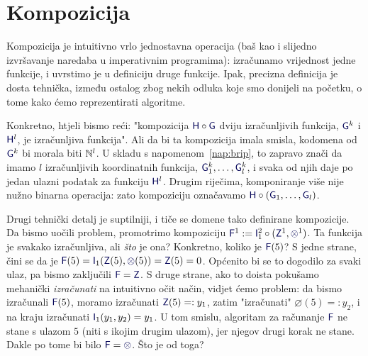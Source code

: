 \section{Kompozicija}

Kompozicija je intuitivno vrlo jednostavna operacija (baš kao i slijedno izvršavanje naredaba u imperativnim programima): izračunamo vrijednost jedne funkcije, i uvrstimo je u definiciju druge funkcije. Ipak, precizna definicija je dosta tehnička, između ostalog zbog nekih odluka koje smo donijeli na početku, o tome kako ćemo reprezentirati algoritme.

Konkretno, htjeli bismo reći: "kompozicija $\f H\circ\f G$ dviju izračunljivih funkcija, $\f G^k$ i $\f H^l$, je izračunljiva funkcija". Ali da bi ta kompozicija imala smisla, kodomena od $\f G^k$ bi morala biti ${\mathbb N}^l$. U skladu s napomenom~\ref{nap:brip}, to zapravo znači da imamo $l$ izračunljivih koordinatnih funkcija, $\f G_1^k,\dotsc,\f G_l^k$, i svaka od njih daje po jedan ulazni podatak za funkciju $\f H^l$. Drugim riječima, komponiranje više nije nužno binarna operacija: zato kompoziciju označavamo $\f H\circ(\f G_1,\dotsc,\f G_l)$.

Drugi tehnički detalj je suptilniji, i tiče se domene tako definirane kompozicije. Da bismo uočili problem, promotrimo kompoziciju $\f F^1:=\f I_1^2\circ(\f Z^1,\varnothing^1)$. Ta funkcija je svakako izračunljiva, ali \emph{što} je ona? Konkretno, koliko je $\f F(5)$? S jedne strane, čini se da je $\f F(5)=\f I_1(\f Z(5),\varnothing(5))=\f Z(5)=0$. Općenito bi se to dogodilo za svaki ulaz, pa bismo zaključili $\f F =\f Z$. S druge strane, ako to doista pokušamo mehanički \emph{izračunati} na intuitivno očit način, vidjet ćemo problem: da bismo izračunali $\f F(5)$, moramo izračunati $\f Z(5)=:y_1$, zatim "izračunati" $\varnothing(5)=:y_2$, i na kraju izračunati $\f I_1(y_1,y_2)=y_1$. U tom smislu, algoritam za računanje $\f F$ ne stane s ulazom $5$ (niti s ikojim drugim ulazom), jer njegov drugi korak ne stane. Dakle po tome bi bilo $\f F=\varnothing$. Što je od toga?


